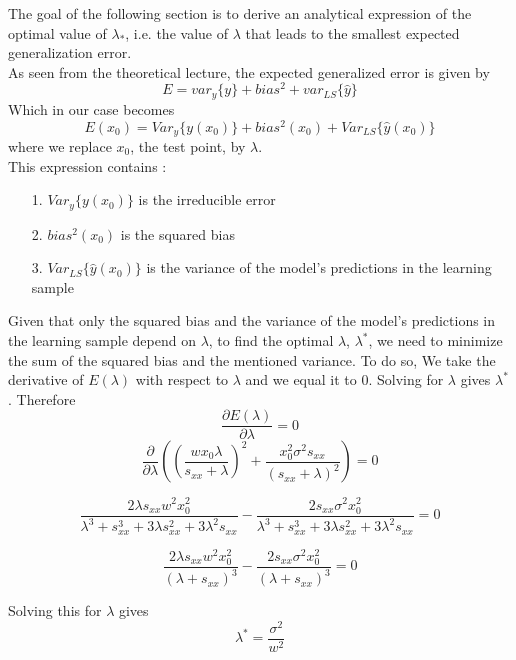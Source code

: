 \documentclass[12pt,titlepage]{article}
\begin{document}
The goal of the following section is to derive an analytical expression of the optimal value of $\lambda_*$, i.e. the value of $\lambda$ that leads to the smallest expected generalization error. \\
As seen from the theoretical lecture, the expected generalized error is given by 
$$ E = var_{y}\{y\} + bias^{2} + var_{LS}\{\hat{y}\} $$
Which in our case becomes 
$$ E(x_{0}) = Var_{y}\{y(x_{0})\} + bias^{2}(x_{0}) + Var_{LS}\{\hat{y}(x_{0})\} $$ 
where we replace $x_{0}$, the test point, by $\lambda$.\\
This expression contains :
\begin{itemize}
    \item[1.] $Var_{y}\{y(x_{0})\}$ is the irreducible error
    \item[2.] $bias^{2}(x_{0})$ is the squared bias
    \item[3.] $Var_{LS}\{\hat{y}(x_{0})\}$ is the variance of the model's predictions in the learning sample
\end{itemize}
Given that only the squared bias and the variance of the model's predictions in the learning sample depend on $\lambda$, to find the optimal $\lambda$, $\lambda^{*}$, we need to minimize the sum of the squared bias and the mentioned variance. To do so, We take the derivative of $E(\lambda)$ with respect to $\lambda$ and we equal it to 0. Solving for $\lambda$ gives $\lambda^{*}$. Therefore
$$ \frac{\partial E(\lambda)}{\partial \lambda} = 0 $$
$$ \frac{\partial}{\partial \lambda}\left(\left(\frac{wx_{0}\lambda}{s_{xx} + \lambda}\right)^{2} + \frac{x_{0}^{2}\sigma^{2}s_{xx}}{(s_{xx} + \lambda)^{2}}\right) = 0$$


$$ \frac{2 \lambda s_{xx} w^2 x_{0}^2}{\lambda^3 + s_{xx}^3 + 3 \lambda s_{xx}^2 + 3 \lambda^2 s_{xx}} - \frac{2 s_{xx} \sigma^2 x_{0}^2}{\lambda^3 + s_{xx}^3 + 3 \lambda s_{xx}^2 + 3 \lambda^2 s_{xx}} = 0 $$

$$ \frac{2 \lambda s_{xx} w^2 x_{0}^2}{(\lambda + s_{xx})^{3}} - \frac{2 s_{xx} \sigma^2 x_{0}^2}{(\lambda + s_{xx})^{3}} = 0 $$

Solving this for $\lambda$ gives
$$ \lambda^{*} = \frac{\sigma^{2}}{w^{2}}$$
\end{document}
